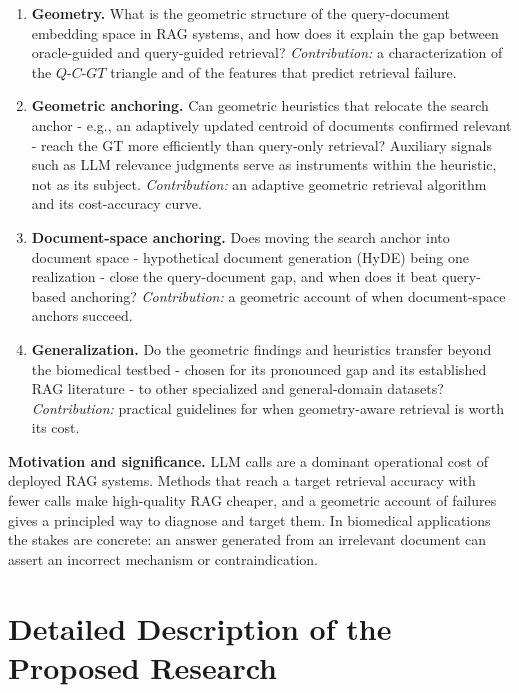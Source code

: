 \documentclass[11pt,a4paper]{article}
\begin{document}
\begin{enumerate}[label=\textbf{RQ\arabic*.}, leftmargin=2.6em]
  \item \textbf{Geometry.} What is the geometric structure of the query-document embedding space in RAG systems, and how does it explain the gap between oracle-guided and query-guided retrieval? \textit{Contribution:} a characterization of the $Q$-$C$-$GT$ triangle and of the features that predict retrieval failure.
  \item \textbf{Geometric anchoring.} Can geometric heuristics that relocate the search anchor - e.g., an adaptively updated centroid of documents confirmed relevant - reach the GT more efficiently than query-only retrieval? Auxiliary signals such as LLM relevance judgments serve as instruments within the heuristic, not as its subject. \textit{Contribution:} an adaptive geometric retrieval algorithm and its cost-accuracy curve.
  \item \textbf{Document-space anchoring.} Does moving the search anchor into document space - hypothetical document generation (HyDE) being one realization - close the query-document gap, and when does it beat query-based anchoring? \textit{Contribution:} a geometric account of when document-space anchors succeed.
  \item \textbf{Generalization.} Do the geometric findings and heuristics transfer beyond the biomedical testbed - chosen for its pronounced gap and its established RAG literature - to other specialized and general-domain datasets? \textit{Contribution:} practical guidelines for when geometry-aware retrieval is worth its cost.
\end{enumerate}

\textbf{Motivation and significance.} LLM calls are a dominant operational cost of deployed RAG systems. Methods that reach a target retrieval accuracy with fewer calls make high-quality RAG cheaper, and a geometric account of failures gives a principled way to diagnose and target them. In biomedical applications the stakes are concrete: an answer generated from an irrelevant document can assert an incorrect mechanism or contraindication.

\section{Detailed Description of the Proposed Research}
\end{document}
